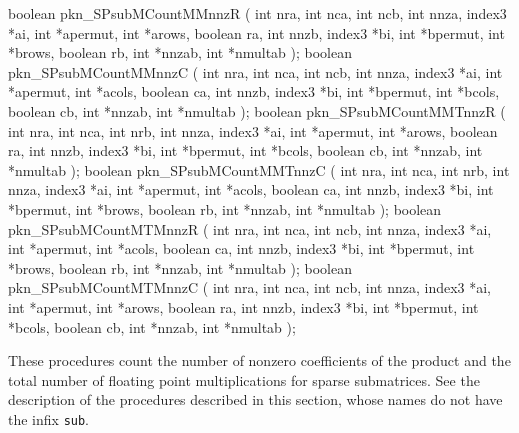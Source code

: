\medskip
\begin{listingC}
boolean pkn_SPsubMCountMMnnzR ( int nra, int nca, int ncb,
                                int nnza, index3 *ai,
                                int *apermut, int *arows, boolean ra,
                                int nnzb, index3 *bi,
                                int *bpermut, int *brows, boolean rb,
                                int *nnzab, int *nmultab );
boolean pkn_SPsubMCountMMnnzC ( int nra, int nca, int ncb,
                                int nnza, index3 *ai,
                                int *apermut, int *acols, boolean ca,
                                int nnzb, index3 *bi,
                                int *bpermut, int *bcols, boolean cb,
                                int *nnzab, int *nmultab );
boolean pkn_SPsubMCountMMTnnzR ( int nra, int nca, int nrb,
                                 int nnza, index3 *ai,
                                 int *apermut, int *arows, boolean ra,
                                 int nnzb, index3 *bi,
                                 int *bpermut, int *bcols, boolean cb,
                                 int *nnzab, int *nmultab );
boolean pkn_SPsubMCountMMTnnzC ( int nra, int nca, int nrb,
                                 int nnza, index3 *ai,
                                 int *apermut, int *acols, boolean ca,
                                 int nnzb, index3 *bi,
                                 int *bpermut, int *brows, boolean rb,
                                 int *nnzab, int *nmultab );
boolean pkn_SPsubMCountMTMnnzR ( int nra, int nca, int ncb,
                                 int nnza, index3 *ai,
                                 int *apermut, int *acols, boolean ca,
                                 int nnzb, index3 *bi,
                                 int *bpermut, int *brows, boolean rb,
                                 int *nnzab, int *nmultab );
boolean pkn_SPsubMCountMTMnnzC ( int nra, int nca, int ncb,
                                 int nnza, index3 *ai,
                                 int *apermut, int *arows, boolean ra,
                                 int nnzb, index3 *bi,
                                 int *bpermut, int *bcols, boolean cb,
                                 int *nnzab, int *nmultab );
\end{listingC}
These procedures count the number of nonzero coefficients of the product
and the total number of floating point multiplications for sparse
submatrices. See the description of the procedures described in this
section, whose names do not have the infix \texttt{sub}.


